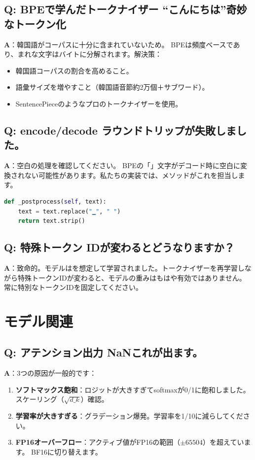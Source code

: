\subsection{Q: BPEで学んだトークナイザー ``こんにちは''奇妙なトークン化}

\textbf{A}：韓国語がコーパスに十分に含まれていないため。 BPEは頻度ベースであり、まれな文字はバイトに分解されます。解決策：
\begin{itemize}
\item 韓国語コーパスの割合を高めること。
\item 語彙サイズを増やすこと（韓国語音節約2万個＋サブワード）。
\item SentencePieceのようなプロのトークナイザーを使用。
\end{itemize}

\subsection{Q: encode/decode ラウンドトリップが失敗しました。}

\textbf{A}：空白の処理を確認してください。 BPEの「」文字がデコード時に空白に変換されない可能性があります。私たちの実装では、メソッドがこれを担当します。

\begin{lstlisting}[language=Python]
def _postprocess(self, text):
    text = text.replace("▁", " ")
    return text.strip()
\end{lstlisting}

\subsection{Q: 特殊トークン IDが変わるとどうなりますか？}

\textbf{A}：致命的。モデルはを想定して学習されました。トークナイザーを再学習しながら特殊トークンIDが変わると、モデルの重みはもはや有効ではありません。常に特別なトークンIDを固定してください。

\section{モデル関連}

\subsection{Q: アテンション出力 NaNこれが出ます。}

\textbf{A}：3つの原因が一般的です：
\begin{enumerate}
\item\textbf{ソフトマックス飽和}：ロジットが大きすぎてsoftmaxが0/1に飽和しました。スケーリング（$\sqrt{d\_k}$）確認。
\item\textbf{学習率が大きすぎる}：グラデーション爆発。学習率を1/10に減らしてください。
\item\textbf{FP16オーバーフロー}：アクティブ値がFP16の範囲（$\pm 65504$）を超えています。 BF16に切り替えます。
\end{enumerate}


